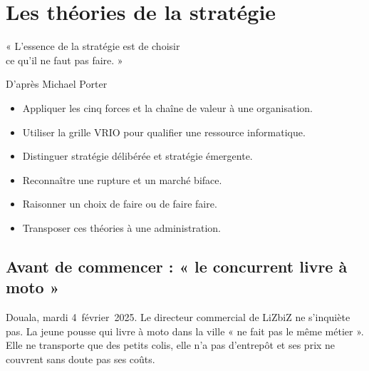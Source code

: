
\chapter{Les théories de la stratégie}
\label{chap:strategie}

\epigraph{%
    « L'essence de la stratégie est de choisir\\
    ce qu'il ne faut pas faire. »%
}{D'après Michael Porter}


\begin{boxobjectifs}
\begin{itemize}
    \item Appliquer les cinq forces et la chaîne de valeur à une organisation.
    \item Utiliser la grille VRIO pour qualifier une ressource informatique.
    \item Distinguer stratégie délibérée et stratégie émergente.
    \item Reconnaître une rupture et un marché biface.
    \item Raisonner un choix de faire ou de faire faire.
    \item Transposer ces théories à une administration.
\end{itemize}
\end{boxobjectifs}

\bigskip

\section*{Avant de commencer : « le concurrent livre à moto »}

Douala, mardi 4~février~2025. Le directeur commercial de LiZbiZ ne s'inquiète pas. La jeune pousse qui livre à
moto dans la ville « ne fait pas le même métier ». Elle ne transporte que des petits colis, elle n'a pas
d'entrepôt et ses prix ne couvrent sans doute pas ses coûts.

